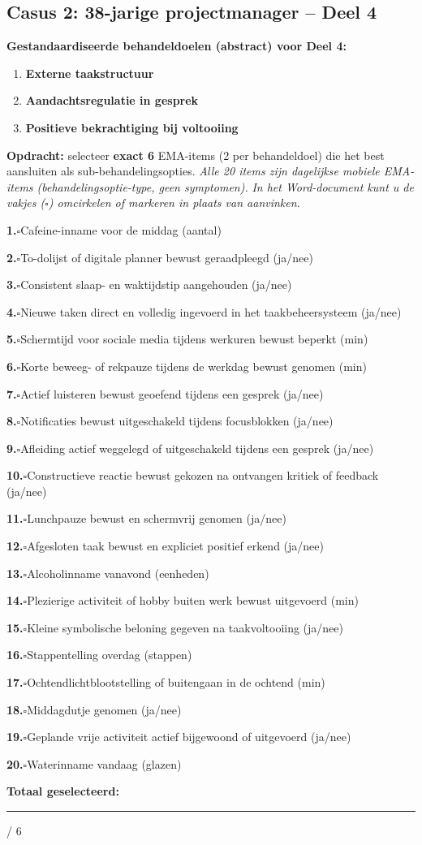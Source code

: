 \documentclass[11pt,a4paper]{article}
\newcommand{\checkitemBFS}[2]{%
\noindent\small\textbf{#1.}\hspace{0.45em}$\square$\hspace{0.4em}#2\par\vspace{0.20em}}
\begin{document}
\vspace{0.6em}
\newpage
\subsection*{Casus 2: 38-jarige projectmanager -- Deel 4}

\begin{contextbox}
\small\textbf{Gestandaardiseerde behandeldoelen (abstract) voor Deel 4:}
\begin{enumerate}[topsep=2pt,itemsep=1pt,label=\arabic*.]
\item \textbf{Externe taakstructuur}
\item \textbf{Aandachtsregulatie in gesprek}
\item \textbf{Positieve bekrachtiging bij voltooiing}
\end{enumerate}
\end{contextbox}

\begin{responsebox}
\small\textbf{Opdracht:} selecteer \textbf{exact 6} EMA-items (2 per behandeldoel) die het best aansluiten als sub-behandelingsopties.
\textit{Alle 20 items zijn dagelijkse mobiele EMA-items (behandelingsoptie-type, geen symptomen).}
\textit{In het Word-document kunt u de vakjes ($\square$) omcirkelen of markeren in plaats van aanvinken.}

\checkitemBFS{1}{Cafeine-inname voor de middag (aantal)}
\checkitemBFS{2}{To-dolijst of digitale planner bewust geraadpleegd (ja/nee)}
\checkitemBFS{3}{Consistent slaap- en waktijdstip aangehouden (ja/nee)}
\checkitemBFS{4}{Nieuwe taken direct en volledig ingevoerd in het taakbeheersysteem (ja/nee)}
\checkitemBFS{5}{Schermtijd voor sociale media tijdens werkuren bewust beperkt (min)}
\checkitemBFS{6}{Korte beweeg- of rekpauze tijdens de werkdag bewust genomen (min)}
\checkitemBFS{7}{Actief luisteren bewust geoefend tijdens een gesprek (ja/nee)}
\checkitemBFS{8}{Notificaties bewust uitgeschakeld tijdens focusblokken (ja/nee)}
\checkitemBFS{9}{Afleiding actief weggelegd of uitgeschakeld tijdens een gesprek (ja/nee)}
\checkitemBFS{10}{Constructieve reactie bewust gekozen na ontvangen kritiek of feedback (ja/nee)}
\checkitemBFS{11}{Lunchpauze bewust en schermvrij genomen (ja/nee)}
\checkitemBFS{12}{Afgesloten taak bewust en expliciet positief erkend (ja/nee)}
\checkitemBFS{13}{Alcoholinname vanavond (eenheden)}
\checkitemBFS{14}{Plezierige activiteit of hobby buiten werk bewust uitgevoerd (min)}
\checkitemBFS{15}{Kleine symbolische beloning gegeven na taakvoltooiing (ja/nee)}
\checkitemBFS{16}{Stappentelling overdag (stappen)}
\checkitemBFS{17}{Ochtendlichtblootstelling of buitengaan in de ochtend (min)}
\checkitemBFS{18}{Middagdutje genomen (ja/nee)}
\checkitemBFS{19}{Geplande vrije activiteit actief bijgewoond of uitgevoerd (ja/nee)}
\checkitemBFS{20}{Waterinname vandaag (glazen)}
\vspace{0.4em}
\noindent\textbf{Totaal geselecteerd:}\hspace{0.5em}\rule{1.2cm}{0.25pt}\hspace{0.2em}/ 6
\end{responsebox}
\end{document}
